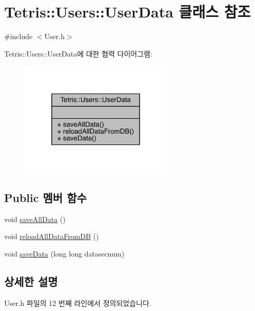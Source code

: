 \hypertarget{class_tetris_1_1_users_1_1_user_data}{}\section{Tetris\+:\+:Users\+:\+:User\+Data 클래스 참조}
\label{class_tetris_1_1_users_1_1_user_data}


{\ttfamily \#include $<$User.\+h$>$}



Tetris\+:\+:Users\+:\+:User\+Data에 대한 협력 다이어그램\+:
\nopagebreak
\begin{figure}[H]
\begin{center}
\leavevmode
\includegraphics[width=208pt]{db/db9/class_tetris_1_1_users_1_1_user_data__coll__graph}
\end{center}
\end{figure}
\subsection*{Public 멤버 함수}
\begin{DoxyCompactItemize}
\item 
void \hyperlink{class_tetris_1_1_users_1_1_user_data_a0910f2f58efaa7d215804802144db8be}{save\+All\+Data} ()
\item 
void \hyperlink{class_tetris_1_1_users_1_1_user_data_af35019c1e222aef020c2e167fc6cf05d}{reload\+All\+Data\+From\+DB} ()
\item 
void \hyperlink{class_tetris_1_1_users_1_1_user_data_a18d94f063a675f9f1310745c9a5fd882}{save\+Data} (long long datasecnum)
\end{DoxyCompactItemize}


\subsection{상세한 설명}


User.\+h 파일의 12 번째 라인에서 정의되었습니다.



